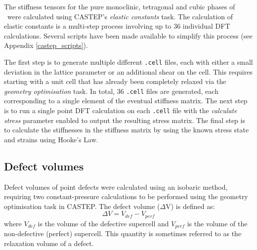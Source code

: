 The stiffness tensors for the pure monoclinic, tetragonal and cubic phases of \zirconia\ were calculated using CASTEP's \emph{elastic constants} task. The calculation of elastic constants is a multi-step process involving up to 36 individual DFT calculations. Several scripts have been made available to simplify this process (see Appendix \ref{castep_scripts}).

The first step is to generate multiple different \texttt{.cell} files, each with either a small deviation in the lattice parameter or an additional shear on the cell. This requires starting with a unit cell that has already been completely relaxed via the \emph{geometry optimisation} task. In total, 36 \texttt{.cell} files are generated, each corresponding to a single element of the eventual stiffness matrix. The next step is to run a single point DFT calculation on each \texttt{.cell} file with the \emph{calculate stress} parameter enabled to output the resulting stress matrix. The final step is to calculate the stiffnesses in the stiffness matrix by using the known stress state and strains using Hooke's Law. 

%

\subsection{Defect volumes} \label{isobaricmethod}

Defect volumes of point defects were calculated using an isobaric method, requiring two constant-pressure calculations to be performed using the geometry optimisation task in CASTEP. The defect volume ($\Delta$V) is defined as: 
\begin{equation}
\Delta V = V_{def} - V_{perf}
\end{equation}
where $V_{def}$ is the volume of the defective supercell and $V_{perf}$ is the volume of the non-defective (perfect) supercell. This quantity is sometimes referred to as the relaxation volume of a defect.

